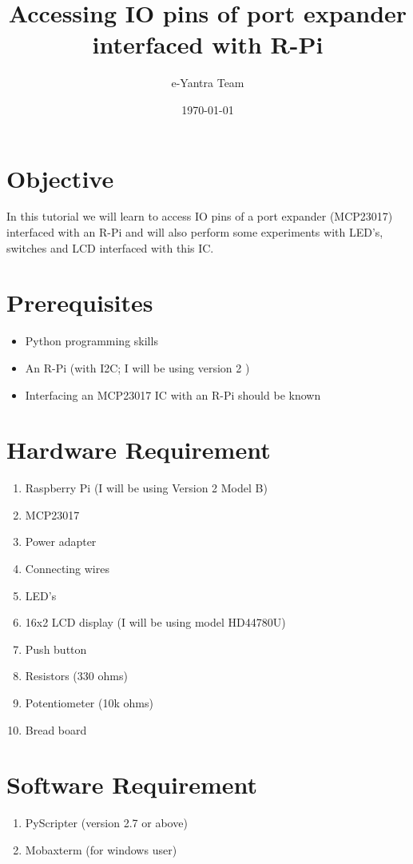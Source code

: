 \documentclass[11pt,a4paper]{article}
\title{Accessing IO pins of port expander interfaced with R-Pi}
\author{e-Yantra Team}
\date{\today}
\begin{document}
	\maketitle
	\newpage
	\tableofcontents
	\newpage
	\section{Objective}
	In this tutorial we will learn to access IO pins of a port expander (MCP23017) interfaced with an R-Pi and will also perform some experiments with LED's, switches and LCD interfaced with this IC.
	\section{Prerequisites}
	\begin{itemize}
		\item Python programming skills
		\item An R-Pi (with I2C; I will be using version 2 ) 
		\item Interfacing an MCP23017 IC with an R-Pi should be known
	\end{itemize}
	
	\section{Hardware Requirement}
    \begin{enumerate}
    	\item Raspberry Pi (I will be using Version 2 Model B)
    	\item MCP23017
    	\item Power adapter
    	\item Connecting wires
    	\item LED's
    	\item 16x2 LCD display (I will be using model HD44780U)
    	\item Push button
    	\item Resistors (330 ohms)
    	\item Potentiometer (10k ohms)
    	\item Bread board
    \end{enumerate}
    
	\section{Software Requirement}
	\begin{enumerate}
		\item PyScripter (version 2.7 or above)
		\item Mobaxterm (for windows user)
	\end{enumerate}
	
\end{document}
